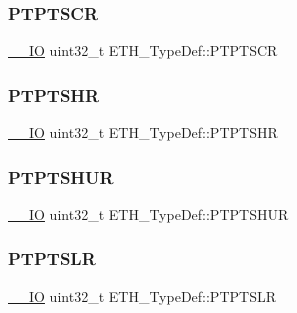 \mbox{\label{struct_e_t_h___type_def_a09c223e5355a8c5885f3e168dd568079}} 
\subsubsection{\texorpdfstring{PTPTSCR}{PTPTSCR}}
{\footnotesize\ttfamily \mbox{\hyperlink{group___c_m_s_i_s___c_m3__core__definitions_gaec43007d9998a0a0e01faede4133d6be}{\+\_\+\+\_\+\+IO}} uint32\+\_\+t E\+T\+H\+\_\+\+Type\+Def\+::\+P\+T\+P\+T\+S\+CR}

\mbox{\label{struct_e_t_h___type_def_a30881f198009fd17e28644d9449045f5}} 
\subsubsection{\texorpdfstring{PTPTSHR}{PTPTSHR}}
{\footnotesize\ttfamily \mbox{\hyperlink{group___c_m_s_i_s___c_m3__core__definitions_gaec43007d9998a0a0e01faede4133d6be}{\+\_\+\+\_\+\+IO}} uint32\+\_\+t E\+T\+H\+\_\+\+Type\+Def\+::\+P\+T\+P\+T\+S\+HR}

\mbox{\label{struct_e_t_h___type_def_a5e5c20f4ddc155ec5c7f976ebfb60c2a}} 
\subsubsection{\texorpdfstring{PTPTSHUR}{PTPTSHUR}}
{\footnotesize\ttfamily \mbox{\hyperlink{group___c_m_s_i_s___c_m3__core__definitions_gaec43007d9998a0a0e01faede4133d6be}{\+\_\+\+\_\+\+IO}} uint32\+\_\+t E\+T\+H\+\_\+\+Type\+Def\+::\+P\+T\+P\+T\+S\+H\+UR}

\mbox{\label{struct_e_t_h___type_def_a56638794c54141bb1b8ef6ac31a6997d}} 
\subsubsection{\texorpdfstring{PTPTSLR}{PTPTSLR}}
{\footnotesize\ttfamily \mbox{\hyperlink{group___c_m_s_i_s___c_m3__core__definitions_gaec43007d9998a0a0e01faede4133d6be}{\+\_\+\+\_\+\+IO}} uint32\+\_\+t E\+T\+H\+\_\+\+Type\+Def\+::\+P\+T\+P\+T\+S\+LR}

